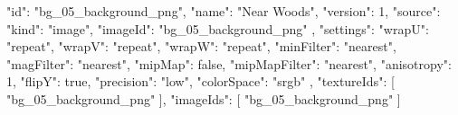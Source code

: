{
  "id": "bg_05_background_png",
  "name": "Near Woods",
  "version": 1,
  "source": {
    "kind": "image",
    "imageId": "bg_05_background_png"
  },
  "settings": {
    "wrapU": "repeat",
    "wrapV": "repeat",
    "wrapW": "repeat",
    "minFilter": "nearest",
    "magFilter": "nearest",
    "mipMap": false,
    "mipMapFilter": "nearest",
    "anisotropy": 1,
    "flipY": true,
    "precision": "low",
    "colorSpace": "srgb"
  },
  "textureIds": [
    "bg_05_background_png"
  ],
  "imageIds": [
    "bg_05_background_png"
  ]
}
